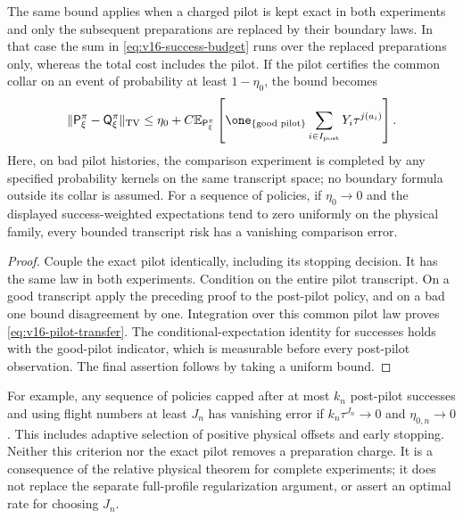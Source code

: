 \begin{corollary}
\label{cor:v16-pilot-transfer}
The same bound applies when a charged pilot is kept exact in both
experiments and only the subsequent preparations are replaced by their
boundary laws. In that case the sum in
\eqref{eq:v16-success-budget} runs over the replaced preparations only,
whereas the total cost includes the pilot. If the pilot certifies the
common collar on an event of probability at least $1-\eta_0$, the bound
becomes
\begin{equation}\label{eq:v16-pilot-transfer}
 \|\mathsf P_\xi^\pi-\mathsf Q_\xi^\pi\|_{\rm TV}
 \le \eta_0+C\mathbb E_{\mathsf P_\xi^\pi}
       \left[\one_{\{\text{good pilot}\}}
         \sum_{i\in I_{\rm post}}Y_i\tau^{j(a_i)}\right].
\end{equation}
Here, on bad pilot histories, the comparison experiment is completed by
any specified probability kernels on the same transcript space; no
boundary formula outside its collar is assumed. For a sequence of policies,
if $\eta_0\to0$ and the displayed success-weighted expectations tend to
zero uniformly on the physical family, every bounded transcript risk
has a vanishing comparison error.
\end{corollary}
\begin{proof}
Couple the exact pilot identically, including its stopping decision.
It has the same law in both experiments. Condition on the entire pilot
transcript. On a good transcript apply the preceding proof to the
post-pilot policy, and on a bad one bound disagreement by one. Integration
over this common pilot law proves \eqref{eq:v16-pilot-transfer}. The
conditional-expectation identity for successes holds with the good-pilot
indicator, which is measurable before every post-pilot observation.
The final assertion follows by taking a uniform bound.
\end{proof}

For example, any sequence of policies capped after at most $k_n$ post-pilot
successes and using flight numbers at least $J_n$ has vanishing error if
$k_n\tau^{J_n}\to0$ and $\eta_{0,n}\to0$. This includes adaptive
selection of positive physical offsets and early stopping. Neither this
criterion nor the exact pilot removes a preparation charge. It is a
consequence of the relative physical theorem for complete experiments;
it does not replace the separate full-profile regularization argument,
or assert an optimal rate for choosing $J_n$.
